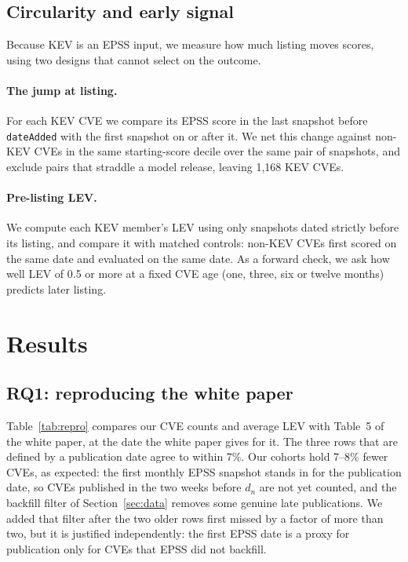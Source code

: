 \subsection{Circularity and early signal}\label{sec:m-leak}

Because KEV is an EPSS input, we measure how much listing moves scores, using
two designs that cannot select on the outcome.

\paragraph{The jump at listing.} For each KEV CVE we compare its EPSS score in
the last snapshot before \texttt{dateAdded} with the first snapshot on or after
it. We net this change against non-KEV CVEs in the same starting-score decile
over the same pair of snapshots, and exclude pairs that straddle a model
release, leaving 1,168 KEV CVEs.

\paragraph{Pre-listing LEV.} We compute each KEV member's LEV using only
snapshots dated strictly before its listing, and compare it with matched
controls: non-KEV CVEs first scored on the same date and evaluated on the same
date. As a forward check, we ask how well LEV of 0.5 or more at a fixed CVE age
(one, three, six or twelve months) predicts later listing.

\section{Results}\label{sec:results}

\subsection{RQ1: reproducing the white paper}\label{sec:res-repro}

Table~\ref{tab:repro} compares our CVE counts and average LEV with Table~5 of
the white paper, at the date the white paper gives for it. The three rows that
are defined by a publication date agree to within 7\%. Our cohorts hold 7--8\%
fewer CVEs, as expected: the first monthly EPSS snapshot stands in for the
publication date, so CVEs published in the two weeks before $d_n$ are not yet
counted, and the backfill filter of Section~\ref{sec:data} removes some
genuine late publications. We added that filter after the two older rows first
missed by a factor of more than two, but it is justified independently: the
first EPSS date is a proxy for publication only for CVEs that EPSS did not
backfill.


